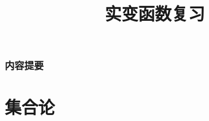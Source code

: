 


\title[实变函数\\
复习]{\texorpdfstring{\Huge \bfseries 实变函数复习}{实变函数复习}} %
\date{}





\begin{frame}

\titlepage %

\end{frame}


\begin{frame}
\frametitle{内容提要} %
\tableofcontents %
\end{frame}


\section[集合论]{集合论}


